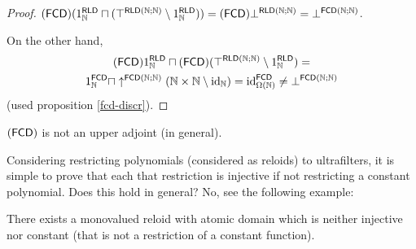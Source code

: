 \begin{proof}
$(\mathsf{FCD})(1_{\mathbb{N}}^{\mathsf{RLD}}\sqcap(\top^{\mathsf{RLD}(\mathbb{N};\mathbb{N})}\setminus1_{\mathbb{N}}^{\mathsf{RLD}}))=(\mathsf{FCD})\bot^{\mathsf{RLD}(\mathbb{N};\mathbb{N})}=\bot^{\mathsf{FCD}(\mathbb{N};\mathbb{N})}$.

On the other hand,
\begin{multline*}
(\mathsf{FCD})1_{\mathbb{N}}^{\mathsf{RLD}}\sqcap(\mathsf{FCD})(\top^{\mathsf{RLD}(\mathbb{N};\mathbb{N})}\setminus1_{\mathbb{N}}^{\mathsf{RLD}})=\\
1_{\mathbb{N}}^{\mathsf{FCD}}\sqcap\uparrow^{\mathsf{FCD}(\mathbb{N};\mathbb{N})}(\mathbb{N}\times\mathbb{N}\setminus\operatorname{id}_{\mathbb{N}})=\operatorname{id}_{\Omega(\mathbb{N})}^{\mathsf{FCD}}\ne\bot^{\mathsf{FCD}(\mathbb{N};\mathbb{N})}
\end{multline*}
(used proposition \ref{fcd-discr}).\end{proof}
\begin{cor}
$(\mathsf{FCD})$ is not an upper adjoint (in general).
\end{cor}
Considering restricting polynomials (considered as reloids) to ultrafilters,
it is simple to prove that each that restriction is injective if not
restricting a constant polynomial. Does this hold in general? No,
see the following example:
\begin{example}
There exists a monovalued reloid with atomic domain which is neither
injective nor constant (that is not a restriction of a constant function).\end{example}
